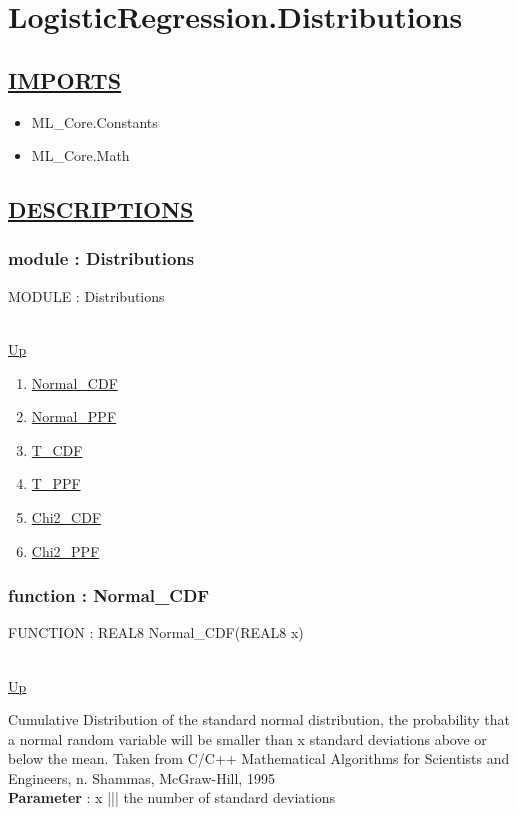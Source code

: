 \chapter*{LogisticRegression.Distributions}
\hypertarget{LogisticRegression.Distributions}{}

\section*{\underline{IMPORTS}}
\begin{itemize}
\item ML\_Core.Constants
\item ML\_Core.Math
\end{itemize}

\section*{\underline{DESCRIPTIONS}}
\subsection*{module : Distributions}
\hypertarget{ecldoc:LogisticRegression.Distributions}{MODULE : Distributions} \\
\hyperlink{ecldoc:}{Up} \\
\par
\begin{enumerate}
\item \hyperlink{ecldoc:logisticregression.distributions.normal_cdf}{Normal\_CDF}
\item \hyperlink{ecldoc:logisticregression.distributions.normal_ppf}{Normal\_PPF}
\item \hyperlink{ecldoc:logisticregression.distributions.t_cdf}{T\_CDF}
\item \hyperlink{ecldoc:logisticregression.distributions.t_ppf}{T\_PPF}
\item \hyperlink{ecldoc:logisticregression.distributions.chi2_cdf}{Chi2\_CDF}
\item \hyperlink{ecldoc:logisticregression.distributions.chi2_ppf}{Chi2\_PPF}
\end{enumerate}
\subsection*{function : Normal\_CDF}
\hypertarget{ecldoc:logisticregression.distributions.normal_cdf}{FUNCTION : REAL8 Normal\_CDF(REAL8 x)} \\
\hyperlink{ecldoc:LogisticRegression.Distributions}{Up} \\
\par
Cumulative Distribution of the standard normal distribution, the probability that a normal random variable will be smaller than x standard deviations above or below the mean. Taken from C/C++ Mathematical Algorithms for Scientists and Engineers, n. Shammas, McGraw-Hill, 1995 \\
\textbf{Parameter} : x ||| the number of standard deviations \\
